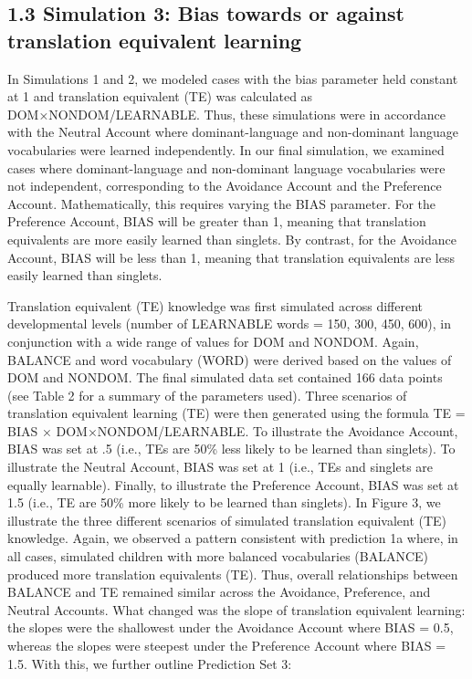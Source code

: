 \documentclass[
  english,
  ,man,floatsintext]{apa6}
\begin{document}
\hypertarget{simulation-3-bias-towards-or-against-translation-equivalent-learning}{%
\subsection{1.3 Simulation 3: Bias towards or against translation equivalent learning}\label{simulation-3-bias-towards-or-against-translation-equivalent-learning}}

In Simulations 1 and 2, we modeled cases with the bias parameter held constant at 1 and translation equivalent (TE) was calculated as DOM×NONDOM/LEARNABLE. Thus, these simulations were in accordance with the Neutral Account where dominant-language and non-dominant language vocabularies were learned independently. In our final simulation, we examined cases where dominant-language and non-dominant language vocabularies were not independent, corresponding to the Avoidance Account and the Preference Account. Mathematically, this requires varying the BIAS parameter. For the Preference Account, BIAS will be greater than 1, meaning that translation equivalents are more easily learned than singlets. By contrast, for the Avoidance Account, BIAS will be less than 1, meaning that translation equivalents are less easily learned than singlets.

Translation equivalent (TE) knowledge was first simulated across different developmental levels (number of LEARNABLE words = 150, 300, 450, 600), in conjunction with a wide range of values for DOM and NONDOM. Again, BALANCE and word vocabulary (WORD) were derived based on the values of DOM and NONDOM. The final simulated data set contained 166 data points (see Table 2 for a summary of the parameters used). Three scenarios of translation equivalent learning (TE) were then generated using the formula TE = BIAS × DOM×NONDOM/LEARNABLE. To illustrate the Avoidance Account, BIAS was set at .5 (i.e., TEs are 50\% less likely to be learned than singlets). To illustrate the Neutral Account, BIAS was set at 1 (i.e., TEs and singlets are equally learnable). Finally, to illustrate the Preference Account, BIAS was set at 1.5 (i.e., TE are 50\% more likely to be learned than singlets). In Figure 3, we illustrate the three different scenarios of simulated translation equivalent (TE) knowledge. Again, we observed a pattern consistent with prediction 1a where, in all cases, simulated children with more balanced vocabularies (BALANCE) produced more translation equivalents (TE). Thus, overall relationships between BALANCE and TE remained similar across the Avoidance, Preference, and Neutral Accounts. What changed was the slope of translation equivalent learning: the slopes were the shallowest under the Avoidance Account where BIAS = 0.5, whereas the slopes were steepest under the Preference Account where BIAS = 1.5. With this, we further outline Prediction Set 3:
\end{document}
